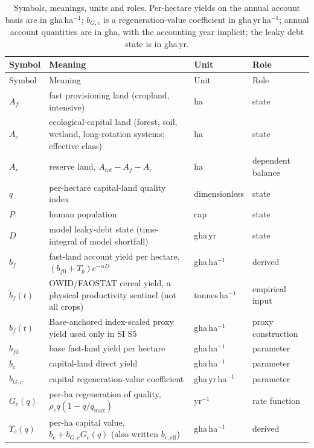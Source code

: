 \documentclass[11pt,a4paper]{article}
\newcommand{\Ups}{\Upsilon_c}
\begin{document}
\begin{longtable}{>{\raggedright\arraybackslash}p{}>{\raggedright\arraybackslash}p{}>{\raggedright\arraybackslash}p{}>{\raggedright\arraybackslash}p{}}
\caption{Symbols, meanings, units and roles. Per-hectare yields on the annual account basis are in gha\,ha$^{-1}$; $b_{G,c}$ is a regeneration-value coefficient in gha\,yr\,ha$^{-1}$; annual account quantities are in gha, with the accounting year implicit; the leaky debt state is in gha\,yr.}\label{tab:si_symbols}\\
\toprule
Symbol & Meaning & Unit & Role \\
\midrule
\endfirsthead
\toprule
Symbol & Meaning & Unit & Role \\
\midrule
\endhead
$A_f$ & fast provisioning land (cropland, intensive) & ha & state \\
$A_c$ & ecological-capital land (forest, soil, wetland, long-rotation systems; effective class) & ha & state \\
$A_r$ & reserve land, $A_{tot}-A_f-A_c$ & ha & dependent balance \\
$q$ & per-hectare capital-land quality index & dimensionless & state \\
$P$ & human population & cap & state \\
$D$ & model leaky-debt state (time-integral of model shortfall) & gha\,yr & state \\
$b_f$ & fast-land account yield per hectare, $(b_{f0}+T_b)e^{-\alpha D}$ & gha\,ha$^{-1}$ & derived \\
$\tilde b_f(t)$ & OWID/FAOSTAT cereal yield, a physical productivity sentinel (not all crops) & tonnes\,ha$^{-1}$ & empirical input \\
$\hat b_f(t)$ & Base-anchored index-scaled proxy yield used only in SI S5 & gha\,ha$^{-1}$ & proxy construction \\
$b_{f0}$ & base fast-land yield per hectare & gha\,ha$^{-1}$ & parameter \\
$b_c$ & capital-land direct yield & gha\,ha$^{-1}$ & parameter \\
$b_{G,c}$ & capital regeneration-value coefficient & gha\,yr\,ha$^{-1}$ & parameter \\
$G_c(q)$ & per-ha regeneration of quality, $\rho_cq(1-q/q_{\max})$ & yr$^{-1}$ & rate function \\
$\Ups(q)$ & per-ha capital value, $b_c+b_{G,c}G_c(q)$ (also written $b_{c,\mathrm{eff}}$) & gha\,ha$^{-1}$ & derived \\

\end{longtable}
\end{document}
